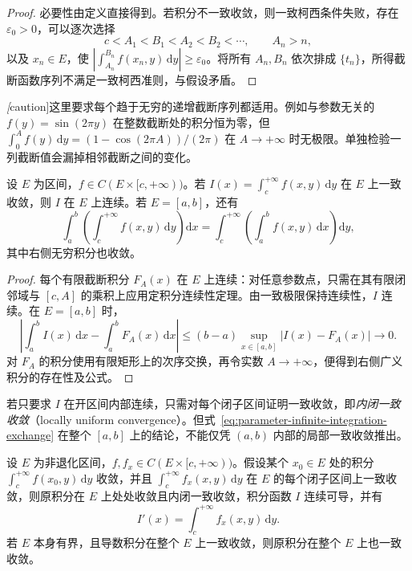 \begin{proof}
必要性由定义直接得到。若积分不一致收敛，则一致柯西条件失败，存在 $\varepsilon_0>0$，可以逐次选择
\[
    c<A_1<B_1<A_2<B_2<\cdots,\qquad A_n>n,
\]
以及 $x_n\in E$，使 $|\int_{A_n}^{B_n}f(x_n,y)\,\mathrm{d}y|\geq\varepsilon_0$。将所有 $A_n,B_n$ 依次排成 $\{t_n\}$，所得截断函数序列不满足一致柯西准则，与假设矛盾。
\end{proof}

\emph[caution]{这里要求每个趋于无穷的递增截断序列都适用。}例如与参数无关的 $f(y)=\sin(2\pi y)$ 在整数截断处的积分恒为零，但 $\int_0^A f(y)\,\mathrm{d}y=(1-\cos(2\pi A))/(2\pi)$ 在 $A\to+\infty$ 时无极限。单独检验一列截断值会漏掉相邻截断之间的变化。

\begin{theorem}[连续性与有限区间上的积分交换]
\label{thm:parameter-infinite-continuity-integration}
设 $E$ 为区间，$f\in C(E\times[c,+\infty))$。若 $I(x)=\int_c^{+\infty}f(x,y)\,\mathrm{d}y$ 在 $E$ 上一致收敛，则 $I$ 在 $E$ 上连续。若 $E=[a,b]$，还有
\begin{equation}
    \int_a^b\left(\int_c^{+\infty}f(x,y)\,\mathrm{d}y\right)\mathrm{d}x
    =\int_c^{+\infty}\left(\int_a^b f(x,y)\,\mathrm{d}x\right)\mathrm{d}y,
    \label{eq:parameter-infinite-integration-exchange}
\end{equation}
其中右侧无穷积分也收敛。
\end{theorem}

\begin{proof}
每个有限截断积分 $F_A(x)$ 在 $E$ 上连续：对任意参数点，只需在其有限闭邻域与 $[c,A]$ 的乘积上应用定积分连续性定理。由一致极限保持连续性，$I$ 连续。在 $E=[a,b]$ 时，
\[
    \left|\int_a^b I(x)\,\mathrm{d}x-\int_a^bF_A(x)\,\mathrm{d}x\right|
    \leq(b-a)\sup_{x\in[a,b]}|I(x)-F_A(x)|\longrightarrow0.
\]
对 $F_A$ 的积分使用有限矩形上的次序交换，再令实数 $A\to+\infty$，便得到右侧广义积分的存在性及公式。
\end{proof}

若只要求 $I$ 在开区间内部连续，只需对每个闭子区间证明一致收敛，即\emph{内闭一致收敛}（locally uniform convergence）。但式~\eqref{eq:parameter-infinite-integration-exchange} 在整个 $[a,b]$ 上的结论，不能仅凭 $(a,b)$ 内部的局部一致收敛推出。

\begin{theorem}[无穷积分的积分号下求导]
\label{thm:parameter-infinite-differentiation}
设 $E$ 为非退化区间，$f,f_x\in C(E\times[c,+\infty))$。假设某个 $x_0\in E$ 处的积分 $\int_c^{+\infty}f(x_0,y)\,\mathrm{d}y$ 收敛，并且 $\int_c^{+\infty}f_x(x,y)\,\mathrm{d}y$ 在 $E$ 的每个闭子区间上一致收敛，则原积分在 $E$ 上处处收敛且内闭一致收敛，积分函数 $I$ 连续可导，并有
\begin{equation}
    I'(x)=\int_c^{+\infty}f_x(x,y)\,\mathrm{d}y.
    \label{eq:parameter-infinite-differentiation}
\end{equation}
若 $E$ 本身有界，且导数积分在整个 $E$ 上一致收敛，则原积分在整个 $E$ 上也一致收敛。
\end{theorem}

